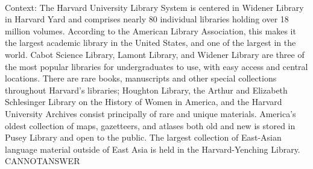 \documentclass[11pt,a4paper, onecolumn]{article}
\begin{document}
\\ Context: The Harvard University Library System is centered in Widener Library in Harvard Yard and comprises nearly 80 individual libraries holding over 18 million volumes. According to the American Library Association, this makes it the largest academic library in the United States, and one of the largest in the world. Cabot Science Library, Lamont Library, and Widener Library are three of the most popular libraries for undergraduates to use, with easy access and central locations. There are rare books, manuscripts and other special collections throughout Harvard's libraries; Houghton Library, the Arthur and Elizabeth Schlesinger Library on the History of Women in America, and the Harvard University Archives consist principally of rare and unique materials. America's oldest collection of maps, gazetteers, and atlases both old and new is stored in Pusey Library and open to the public. The largest collection of East-Asian language material outside of East Asia is held in the Harvard-Yenching Library. CANNOTANSWER
\end{document}
